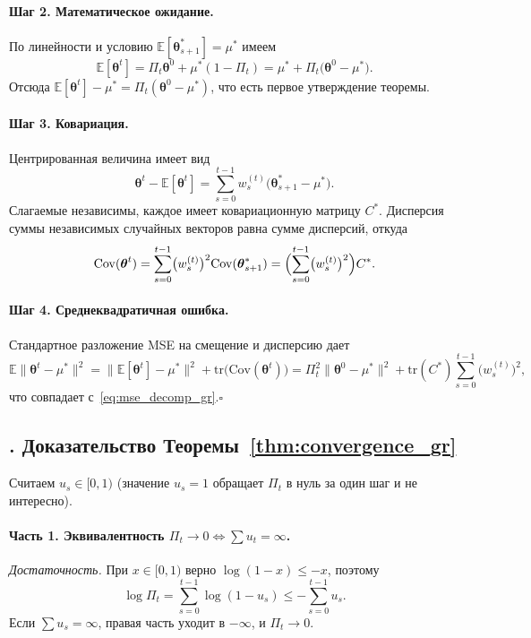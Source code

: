 \documentclass[a4paper,14pt,oneside,openany]{extarticle}
\newcommand{\bbE}{\mathbb{E}}
\newcommand{\btheta}{\boldsymbol{\theta}}
\begin{document}
\paragraph{Шаг 2. Математическое ожидание.} По линейности и условию $\bbE[\btheta^*_{s+1}] = \mu^*$ имеем
\[
    \bbE[\btheta^t] = \Pi_t \btheta^0 + \mu^* (1 - \Pi_t) = \mu^* + \Pi_t \bigl(\btheta^0 - \mu^*\bigr).
\]
Отсюда $\bbE[\btheta^t] - \mu^* = \Pi_t(\btheta^0 - \mu^*)$, что есть первое утверждение теоремы.

\paragraph{Шаг 3. Ковариация.} Центрированная величина имеет вид
\[
    \btheta^t - \bbE[\btheta^t] = \sum_{s=0}^{t-1} w_s^{(t)} \bigl(\btheta^*_{s+1} - \mu^*\bigr).
\]
Слагаемые независимы, каждое имеет ковариационную матрицу $C^*$. Дисперсия суммы независимых случайных векторов равна сумме дисперсий, откуда
\[
    \mathrm{Cov}(\btheta^t) = \sum_{s=0}^{t-1}\bigl(w_s^{(t)}\bigr)^2 \mathrm{Cov}(\btheta^*_{s+1}) = \Bigl(\sum_{s=0}^{t-1}\bigl(w_s^{(t)}\bigr)^2\Bigr) C^*.
\]

\paragraph{Шаг 4. Среднеквадратичная ошибка.} Стандартное разложение MSE на смещение и дисперсию дает
\[
    \bbE\|\btheta^t - \mu^*\|^2 = \bigl\|\bbE[\btheta^t] - \mu^*\bigr\|^2 + \mathrm{tr}\bigl(\mathrm{Cov}(\btheta^t)\bigr) = \Pi_t^2 \|\btheta^0 - \mu^*\|^2 + \mathrm{tr}(C^*) \sum_{s=0}^{t-1}\bigl(w_s^{(t)}\bigr)^2,
\]
что совпадает с~\eqref{eq:mse_decomp_gr}.\hfill$\square$

\subsection*{\theappthm. Доказательство Теоремы~\ref{thm:convergence_gr}}\label{app:proof_convergence_gr}

Считаем $u_s \in [0, 1)$ (значение $u_s = 1$ обращает $\Pi_t$ в нуль за один шаг и не интересно).

\paragraph{Часть 1. Эквивалентность $\Pi_t \to 0 \Leftrightarrow \sum u_t = \infty$.}

\emph{Достаточность.} При $x \in [0, 1)$ верно $\log(1 - x) \le -x$, поэтому
\[
    \log \Pi_t = \sum_{s=0}^{t-1} \log(1 - u_s) \le -\sum_{s=0}^{t-1} u_s.
\]
Если $\sum u_s = \infty$, правая часть уходит в $-\infty$, и $\Pi_t \to 0$.
\end{document}
